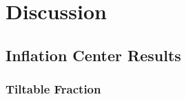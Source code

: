 \chapter{Discussion}\label{cha:discussion}

\section{Inflation Center Results}

\subsection{Tiltable Fraction}\label{sec:tiltable-fraction}




